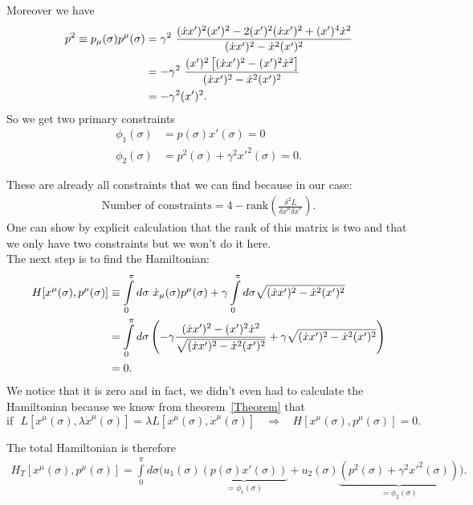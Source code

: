 Moreover we have
\begin{align}
p^2 \equiv p_{\mu}(\sigma) p^{\mu}(\sigma) &= \gamma^2 \ \frac{(\dot{x}x')^2 (x')^2 - 2 (x')^2 (\dot{x}x')^2 + (x')^4 \dot{x}^2}{(\dot{x}x')^2 - \dot{x}^2(x')^2} \notag \\
&= - \gamma^2 \ \frac{(x')^2 \left[ (\dot{x}x')^2 - (x')^2 \dot{x}^2 \right]}{(\dot{x}x')^2 - \dot{x}^2(x')^2} \notag  \\
&= - \gamma^2 (x')^2.
\end{align}
So we get two primary constraints 
\begin{align}
\phi_1(\sigma) &= p(\sigma) x'(\sigma) = 0 \\
\phi_2(\sigma) &= p^2(\sigma) + \gamma^2 x'^2(\sigma) = 0.
\end{align}

These are already all constraints that we can find because in our case:
\begin{align}
\text{Number of constraints} = 4 - \text{rank} \left( \frac{\delta^2 L}{\delta\dot{x}^{\mu} \delta\dot{x}^{\nu}} \right).
\end{align}
One can show by explicit calculation that the rank of this matrix is two and that we only have two constraints but we won't do it here. \\

The next step is to find the Hamiltonian:
\begin{align}
H[x^{\mu}(\sigma), p^{\mu}(\sigma)] &\equiv \displaystyle\int\limits_{0}^{\pi} d\sigma \ \dot{x}_{\mu}(\sigma)p^{\mu}(\sigma) + \gamma \displaystyle\int\limits_{0}^{\pi} d\sigma \sqrt{(\dot{x}x')^2 - \dot{x}^2(x')^2} \notag \\
&= \displaystyle\int\limits_{0}^{\pi} d\sigma \left( - \gamma \frac{(\dot{x}x')^2 - (x')^2 \dot{x}^2}{\sqrt{(\dot{x}x')^2 - \dot{x}^2(x')^2}} + \gamma \sqrt{(\dot{x}x')^2 - \dot{x}^2(x')^2} \right) \notag \\
&= 0.
\end{align}
We notice that it is zero and in fact, we didn't even had to calculate the Hamiltonian because we know from theorem~\ref{Theorem} that 
\begin{equation}
\text{if} \ \ \ L[x^{\mu}(\sigma), \lambda \dot{x}^{\mu}(\sigma)] = \lambda L[x^{\mu}(\sigma), \dot{x}^{\mu}(\sigma)] \ \ \ \ \Longrightarrow \ \ \ \ H[x^{\mu}(\sigma), p^{\mu}(\sigma)] = 0.
\end{equation}

The total Hamiltonian is therefore
\begin{align}
H_T[x^{\mu}(\sigma), p^{\mu}(\sigma)] = \displaystyle\int\limits_{0}^{\pi} d\sigma \Bigg( u_1(\sigma)\underbrace{(p(\sigma)x'(\sigma))}_{=\phi_1(\sigma)} + u_2(\sigma) \underbrace{(p^2(\sigma) + \gamma^2 x'^2(\sigma))}_{=\phi_2(\sigma)}  \Bigg).
\end{align}

